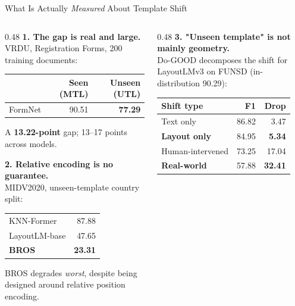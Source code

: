 \documentclass[aspectratio=169, 11pt]{beamer}
\renewcommand{\arraystretch}{1.15}
\newcommand{\gap}[1]{{\color{warn}\textbf{#1}}}
\begin{document}
\begin{frame}{What Is Actually \emph{Measured} About Template Shift}
  \footnotesize
  \begin{columns}[T]
    \begin{column}{0.48\textwidth}
      \textbf{1. The gap is real and large.}\\
      VRDU, Registration Forms, 200 training documents:
      \vspace{2pt}

      {\renewcommand{\arraystretch}{1.0}
      \begin{tabular}{@{}lrr@{}}
        \toprule
        & Seen (MTL) & Unseen (UTL)\\
        \midrule
        FormNet & 90.51 & \gap{77.29}\\
        \bottomrule
      \end{tabular}}
      \vspace{2pt}

      A \gap{13.22-point} gap; 13--17 points across models.
      \smallskip

      \textbf{2. Relative encoding is no guarantee.}\\
      MIDV2020, unseen-template country split:
      \vspace{2pt}

      {\renewcommand{\arraystretch}{1.0}
      \begin{tabular}{@{}lr@{}}
        \toprule
        KNN-Former & 87.88\\
        LayoutLM-base & 47.65\\
        \textbf{BROS} & \gap{23.31}\\
        \bottomrule
      \end{tabular}}
      \vspace{2pt}

      {\color{warn} BROS degrades \emph{worst}, despite being designed around relative position encoding.}
    \end{column}
    \begin{column}{0.48\textwidth}
      \textbf{3. "Unseen template" is not mainly geometry.}\\
      Do-GOOD decomposes the shift for LayoutLMv3 on FUNSD (in-distribution 90.29):
      \vspace{2pt}

      {\renewcommand{\arraystretch}{1.0}
      \begin{tabular}{@{}lrr@{}}
        \toprule
        Shift type & F1 & Drop\\
        \midrule
        Text only & 86.82 & 3.47\\
        \textbf{Layout only} & 84.95 & \textbf{5.34}\\
        Human-intervened & 73.25 & 17.04\\
        \textbf{Real-world} & 57.88 & \gap{32.41}\\
        \bottomrule
      \end{tabular}}
      \vspace{2pt}


\end{column}
\end{columns}
\end{frame}
\end{document}

